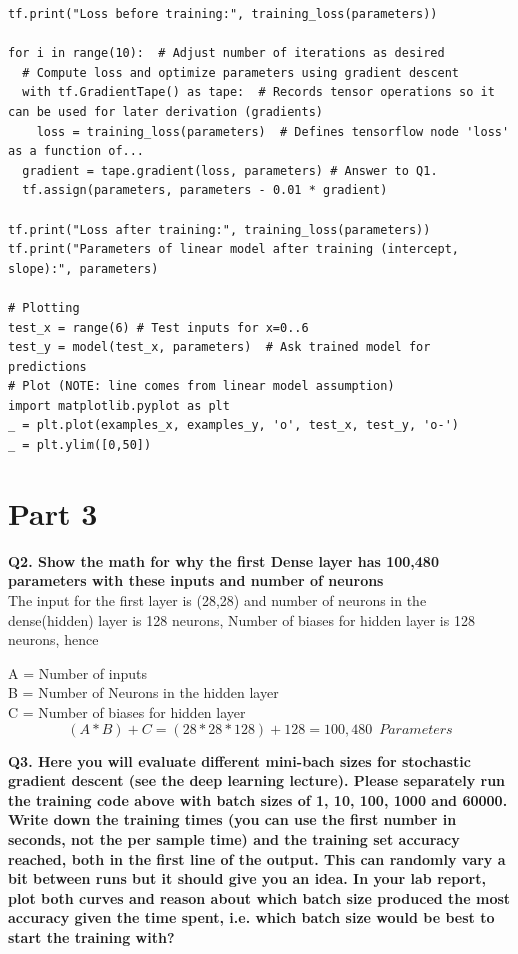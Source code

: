 \documentclass[a4paper,10pt]{article}
\begin{document}
\begin{lstlisting}
tf.print("Loss before training:", training_loss(parameters))

for i in range(10):  # Adjust number of iterations as desired
  # Compute loss and optimize parameters using gradient descent
  with tf.GradientTape() as tape:  # Records tensor operations so it can be used for later derivation (gradients)
    loss = training_loss(parameters)  # Defines tensorflow node 'loss' as a function of...
  gradient = tape.gradient(loss, parameters) # Answer to Q1.
  tf.assign(parameters, parameters - 0.01 * gradient)   

tf.print("Loss after training:", training_loss(parameters))
tf.print("Parameters of linear model after training (intercept, slope):", parameters)

# Plotting
test_x = range(6) # Test inputs for x=0..6
test_y = model(test_x, parameters)  # Ask trained model for predictions
# Plot (NOTE: line comes from linear model assumption)
import matplotlib.pyplot as plt
_ = plt.plot(examples_x, examples_y, 'o', test_x, test_y, 'o-')
_ = plt.ylim([0,50])

\end{lstlisting}

\section*{Part 3}

\textbf{Q2. Show the math for why the first Dense layer has 100,480 parameters with these inputs and number of neurons}\\

The input for the first layer is (28,28) and number of neurons in the dense(hidden) layer is 128 neurons,
Number of biases for hidden layer is 128 neurons, hence
\begin{center}
		\justifying
		A = Number of inputs\\
		B = Number of Neurons in the hidden layer\\
		C = Number of biases for hidden layer\\
		\begin{equation*}
		(A * B) + C = (28*28*128)+128 = 100,480 \,\,\, Parameters
		\end{equation*}
\end{center}

\textbf{Q3. Here you will evaluate different mini-bach sizes for stochastic gradient descent (see the deep learning lecture). 
Please separately run the training code above with batch sizes of 1, 10, 100, 1000 and 60000. 
Write down the training times (you can use the first number in seconds, not the per sample time) and 
the training set accuracy reached, both in the first line of the output. 
This can randomly vary a bit between runs but it should give you an idea. 
In your lab report, plot both curves and reason about which batch size produced the most accuracy 
given the time spent, i.e. which batch size would be best to start the training with?} \\
\end{document}
